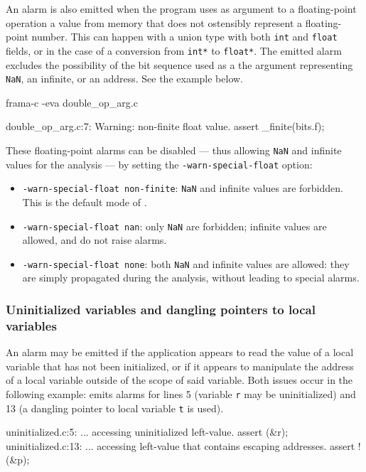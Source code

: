 \documentclass{frama-c-book}
\begin{document}
An alarm is also emitted when the program uses as argument to
a floating-point operation a value from memory that does not
ostensibly represent a floating-point number. This can
happen with a union type with both \lstinline|int| and
\lstinline|float| fields, or in the case of a conversion
from \lstinline|int*| to \lstinline|float*|.  The emitted alarm
excludes the possibility of the bit sequence used as a the
argument representing \lstinline|NaN|, an infinite, or an address.
See the example below.
\begin{frama-c-commands}
frama-c -eva double_op_arg.c
\end{frama-c-commands}
\begin{logsmath}
 double_op_arg.c:7: Warning: non-finite float value.
    assert \is_finite(bits.f);
\end{logsmath}

These floating-point alarms can be disabled — thus allowing \lstinline|NaN| and infinite
values for the analysis — by setting the \lstinline|-warn-special-float|
option:
\begin{itemize}
\item \texttt{-warn-special-float non-finite}: \lstinline|NaN| and infinite
  values are forbidden. This is the default mode of \Eva{}.
\item \texttt{-warn-special-float nan}: only \lstinline|NaN| are forbidden;
  infinite values are allowed, and do not raise alarms.
\item \texttt{-warn-special-float none}: both \lstinline|NaN| and infinite
  values are allowed: they are simply propagated during the analysis, without
  leading to special alarms.
\end{itemize}

\subsubsection{Uninitialized variables and dangling pointers to local variables}
An alarm may be emitted if the application appears to read the
value of a local variable that has not been initialized, or
if it appears to manipulate the address of a local variable outside
of the scope of said variable. Both issues occur in the following
example:
\Eva{} emits alarms for lines 5
(variable \lstinline|r| may be uninitialized)
and 13 (a dangling pointer to local variable \lstinline|t| is used).
\begin{logsmath}
uninitialized.c:5: ...
  accessing uninitialized left-value. assert \initialized(&r);
uninitialized.c:13: ...
  accessing left-value that contains escaping addresses.
  assert !\dangling(&p);
\end{logsmath}
\end{document}
